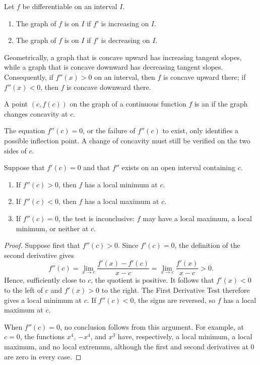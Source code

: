 \begin{definition}
    Let \(f\) be differentiable on an interval \(I\).
    \begin{enumerate}
        \item The graph of \(f\) is  on \(I\) if
        \(f'\) is increasing on \(I\).
        \item The graph of \(f\) is  on \(I\) if
        \(f'\) is decreasing on \(I\).
    \end{enumerate}
\end{definition}

Geometrically, a graph that is concave upward has increasing tangent
slopes, while a graph that is concave downward has decreasing tangent
slopes.  Consequently, if
\(f''(x)>0\) on an interval, then \(f\) is concave upward there; if
\(f''(x)<0\), then \(f\) is concave downward there.

\begin{definition}
    A point \((c,f(c))\) on the graph of a continuous function \(f\) is an
     if the graph changes concavity at \(c\).
\end{definition}

The equation \(f''(c)=0\), or the failure of \(f''(c)\) to exist, only
identifies a possible inflection point.  A change of concavity must still be
verified on the two sides of \(c\).

\begin{theorem}
    Suppose that \(f'(c)=0\) and that \(f''\) exists on an open interval
    containing \(c\).
    \begin{enumerate}
        \item If \(f''(c)>0\), then \(f\) has a local minimum at \(c\).
        \item If \(f''(c)<0\), then \(f\) has a local maximum at \(c\).
        \item If \(f''(c)=0\), the test is inconclusive: \(f\) may have a
        local maximum, a local minimum, or neither at \(c\).
    \end{enumerate}
\end{theorem}
\begin{proof}
    Suppose first that \(f''(c)>0\).  Since \(f'(c)=0\), the definition of
    the second derivative gives
    \[
        f''(c)=\lim_{x\to c}\frac{f'(x)-f'(c)}{x-c}
        =\lim_{x\to c}\frac{f'(x)}{x-c}>0.
    \]
    Hence, sufficiently close to \(c\), the quotient is positive.  It
    follows that \(f'(x)<0\) to the left of \(c\) and \(f'(x)>0\) to the
    right.  The First Derivative Test therefore gives a local minimum at
    \(c\).  If \(f''(c)<0\), the signs are reversed, so \(f\) has a local
    maximum at \(c\).

    When \(f''(c)=0\), no conclusion follows from this argument.  For
    example, at \(c=0\), the functions \(x^4\), \(-x^4\), and \(x^3\) have,
    respectively, a local minimum, a local maximum, and no local extremum,
    although the first and second derivatives at \(0\) are zero in every
    case.
\end{proof}

